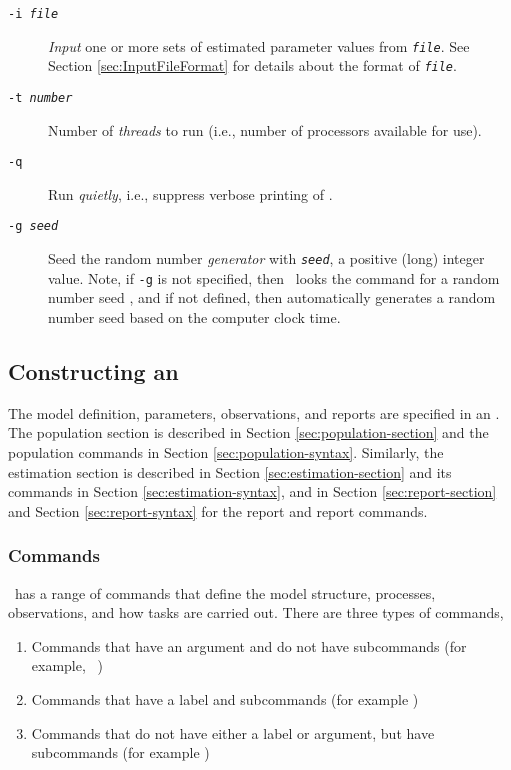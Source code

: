 \begin{description}
\item [\texttt{-i \emph{file}}] \emph{Input} one or more sets of estimated parameter values from \texttt{\emph{file}}. See Section \ref{sec:InputFileFormat} for details about the format of \texttt{\emph{file}}.

\item [\texttt{-t \emph{number}}] Number of \emph{threads} to run (i.e., number of processors available for use).

\item [\texttt{-q}] Run \emph{quietly}, i.e., suppress verbose printing of \SPM.

\item [\texttt{-g \emph{seed}}]  Seed the random number \emph{generator} with \texttt{\emph{seed}}, a positive (long) integer value. Note, if \texttt{-g} is not specified, then \SPM\ looks the command  for a random number seed , and if not defined, then automatically generates a random number seed based on the computer clock time.
\end{description}

\subsection{Constructing an \SPM\ \config \label{constructing-spm-config}}

The model definition, parameters, observations, and reports are specified in an \config. The  population section is described in Section \ref{sec:population-section} and the population commands in Section \ref{sec:population-syntax}. Similarly, the estimation section is described in Section \ref{sec:estimation-section} and its commands in Section \ref{sec:estimation-syntax}, and in Section \ref{sec:report-section} and Section \ref{sec:report-syntax} for the report and report commands. 

\subsubsection{Commands}

\SPM\ has a range of commands that define the model structure, processes, observations, and how tasks are carried out. There are three types of commands, 

\begin{enumerate}
\item Commands that have an argument and do not have subcommands (for example, \ )
\item Commands that have a label and subcommands (for example )
\item Commands that do not have either a label or argument, but have subcommands (for example )
\end{enumerate}

